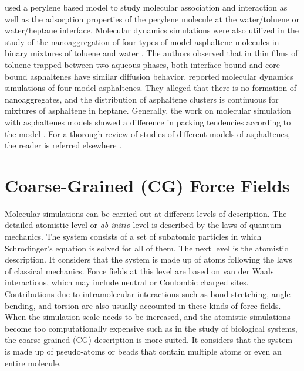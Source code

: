  used a perylene based model to study molecular association and interaction as well as the adsorption properties of the perylene molecule at the water/toluene or water/heptane interface. Molecular dynamics simulations were also utilized in the study of the nanoaggregation of four types of model asphaltene molecules in binary mixtures of toluene and water \cite{doi:10.1021/ef9004576}. The authors observed that in thin films of toluene trapped between two aqueous phases,
both interface-bound and core-bound asphaltenes have similar diffusion behavior.  reported molecular dynamics simulations of four model asphaltenes. They alleged that there is no formation of nanoaggregates, and the distribution of asphaltene clusters is continuous for mixtures of asphaltene in heptane. Generally, the work on molecular simulation with asphaltenes models showed a difference in
packing tendencies according to the model \cite{doi:10.1080/10298436.2011.575141}. For a thorough review of studies of different models of asphaltenes, the reader is referred elsewhere \cite{doi:10.1080/10298436.2011.575141}. 

\section{Coarse-Grained (CG) Force Fields}


Molecular simulations can be carried out at different levels of description. The detailed atomistic level or \textit{ab initio} level is described by the laws of quantum mechanics. The system consists of a set of subatomic particles in which Schrodinger's equation is solved for all of them. The next level is the atomistic description. It considers that the system is made up of atoms following the laws of classical mechanics.  Force fields at this level are based on van der Waals interactions, which may include neutral or Coulombic charged sites. Contributions due to intramolecular interactions such as bond-stretching, angle-bending, and torsion are also usually accounted in these kinds of force fields. When the simulation scale needs to be increased, and the atomistic simulations become too computationally expensive such as in the study of biological systems, the coarse-grained (CG) description is more suited. It considers that the system is made up of pseudo-atoms or beads that contain multiple atoms or even an entire molecule. 

